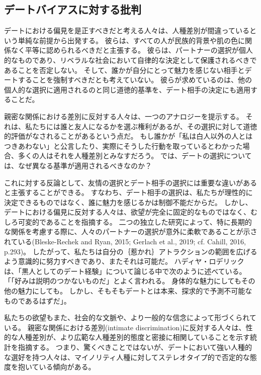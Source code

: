 \documentclass[paper=a4,book,openany]{jlreq}
\begin{document}
\subsection{デートバイアスに対する批判}

デートにおける偏見を是正すべきだと考える人々は、人種差別が間違っているという単純な前提から出発する。
彼らは、すべての人が民族的背景や肌の色に関係なく平等に認められるべきだと主張する。
彼らは、パートナーの選択が個人的なものであり、リベラルな社会において自律的な決定として保護されるべきであることを否定しない。
そして、誰かが自分にとって魅力を感じない相手とデートすることを強制すべきだとも考えていない。
彼らが求めているのは、他の個人的な選択に適用されるのと同じ道徳的基準を、デート相手の決定にも適用することだ。

親密な関係における差別に反対する人々は、一つのアナロジーを提示する。
それは、私たちには誰と友人になるかを選ぶ権利があるが、その選択に対して道徳的評価がなされることがあるという点だ。
もし誰かが「私は白人以外の人とはつきあわない」と公言したり、実際にそうした行動を取っているとわかった場合、多くの人はそれを人種差別とみなすだろう。
では、デートの選択については、なぜ異なる基準が適用されるべきなのか？

これに対する反論として、友情の選択とデート相手の選択には重要な違いがあると主張することができる。
すなわち、デート相手の選択は、私たちが理性的に決定できるものではなく、誰に魅力を感じるかは制御不能だからだ。
しかし、デートにおける偏見に反対する人々は、欲望が完全に固定的なものではなく、むしろ可変的であることを指摘する。
二つの独立した研究によって、特に長期的な関係を考慮する際に、人々のパートナーの選択が意外に柔軟であることが示されている(Bleske-Rechek and Ryan, 2015; Gerlach et al., 2019; cf. Cahill, 2016, p.293)。
\nocite{bleske-rechek15:_contin_chang_emerg,gerlach19:_predic_valid_adjus}
\nocite{cahill16:_sexual_desir_inequal_possib_trans}
したがって、私たちは自分の｛惹かれ｝{アトラクション}の範囲を広げるよう意識的に努力すべきであり、またそれは可能だ。
ハディヤ・ロデリックは、「黒人としてのデート経験」について論じる中で次のように述べている。
「「好みは説明のつかないものだ」とよく言われる。
身体的な魅力にしてもその他の魅力にしても。
しかし、そもそもデートとは本来、探求的で予測不可能なものであるはずだ」\citep{roderique17:_datin_black}。

私たちの欲望もまた、社会的な文脈や、より一般的な信念によって形づくられている。
親密な関係における差別(intimate discrimination)に反対する人々は、性的な人種差別が、より広範な人種差別的態度と密接に相関していることを示す統計を指摘する。
つまり、驚くべきことではないが、デートにおいて強い人種的な選好を持つ人々は、マイノリティ人種に対してステレオタイプ的で否定的な態度を抱いている傾向がある\citep{callander15:_is_sexual_racis_reall_racis}。
\end{document}
